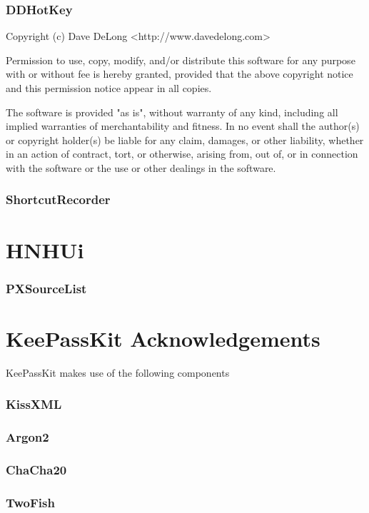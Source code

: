 \documentclass[parskip=half]{scrartcl}
\begin{document}
\section*{DDHotKey}
Copyright (c) Dave DeLong <http://www.davedelong.com>
 
Permission to use, copy, modify, and/or distribute this software for any purpose with or without fee is hereby granted, provided that the above copyright notice and this permission notice appear in all copies.
 
The software is  provided "as is", without warranty of any kind, including all implied warranties of merchantability and fitness. In no event shall the author(s) or copyright holder(s) be liable for any claim, damages, or other liability, whether in an action of contract, tort, or otherwise, arising from, out of, or in connection with the software or the use or other dealings in the software.

\section*{ShortcutRecorder}

\part*{HNHUi}
\section*{PXSourceList}

\part*{KeePassKit Acknowledgements}

KeePassKit makes use of the following components

\section*{KissXML}
\section*{Argon2}
\section*{ChaCha20}
\section*{TwoFish}
\end{document}

